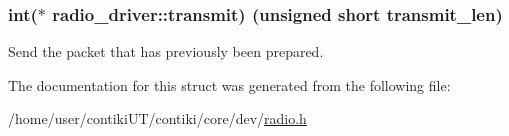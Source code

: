 \subsubsection[{transmit}]{\setlength{\rightskip}{0pt plus 5cm}int($\ast$  radio\+\_\+driver\+::transmit) (unsigned short transmit\+\_\+len)}\label{structradio__driver_a5e0e87a4384c32182b9047f4f65d24e1}
Send the packet that has previously been prepared. 

The documentation for this struct was generated from the following file\+:\begin{DoxyCompactItemize}
\item 
/home/user/contiki\+U\+T/contiki/core/dev/\hyperlink{radio_8h}{radio.\+h}\end{DoxyCompactItemize}
